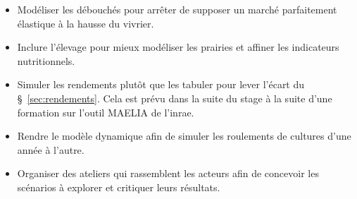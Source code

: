 \begin{itemize}[leftmargin=1.2em,itemsep=3pt]
  \item Modéliser les débouchés pour arrêter de supposer un marché parfaitement élastique à la
    hausse du vivrier.
  \item Inclure l'élevage pour mieux modéliser les prairies et affiner les indicateurs
    nutritionnels.
  \item Simuler les rendements plutôt que les tabuler pour lever l'écart du
    §~\ref{sec:rendements}. Cela est prévu dans la suite du stage à la suite d'une formation sur
    l'outil MAELIA de l'\gls{inrae}.
  \item Rendre le modèle dynamique afin de simuler les roulements de cultures d'une année à
    l'autre.
  \item Organiser des ateliers qui rassemblent les acteurs afin de concevoir les scénarios à
    explorer et critiquer leurs résultats.
\end{itemize}
